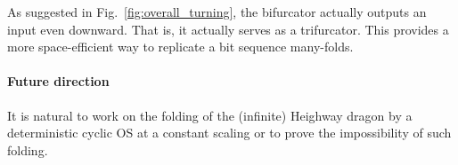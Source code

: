 \begin{remark}
As suggested in Fig.~\ref{fig:overall_turning}, the bifurcator actually outputs an input even downward.
That is, it actually serves as a trifurcator.
This provides a more space-efficient way to replicate a bit sequence many-folds.
\end{remark}

\paragraph{Future direction} 
It is natural to work on the folding of the (infinite) Heighway dragon by a deterministic cyclic OS at a constant scaling or to prove the impossibility of such folding. 

